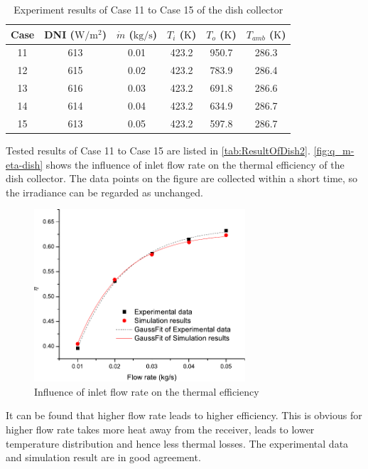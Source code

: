 \begin{table}[htbp]
	\caption{Experiment results of Case 11 to Case 15 of the dish collector}
	\centering
	\begin{tabular}{cccccc}
		\toprule
		Case	& DNI ($\mathrm{W/m^2}$)	&	$\dot{m}$ ($\mathrm{kg/s}$)			&	$T_i$ ($\mathrm{K}$)	&	$T_o$ ($\mathrm{K}$)		&	$T_{amb}$ ($\mathrm{K}$)\\
		\midrule
		11	&	613	&	0.01	&	423.2	&	950.7	&	286.3\\
		12	&	615	&	0.02	&	423.2	&	783.9	&	286.4\\
		13	&	616	&	0.03	&	423.2	&	691.8	&	286.6	\\
		14	&	614	&	0.04	&	423.2	&	634.9	&	286.7\\
		15	&	613	&	0.05	&	423.2	&	597.8	&	286.7\\
		\bottomrule
	\end{tabular}
	
	\label{tab:ResultOfDish2}
\end{table}
Tested results of Case 11 to Case 15 are listed in \autoref{tab:ResultOfDish2}.
\autoref{fig:q_m-eta-dish} shows the influence of inlet flow rate on the thermal efficiency of the dish collector. The data points on the figure are collected within a short time, so the irradiance can be regarded as unchanged.
\begin{figure}[!ht]
\centering
\includegraphics[width=0.7\textwidth]{fig/q_m-eta-dish}
\caption{Influence of inlet flow rate on the thermal efficiency}
\label{fig:q_m-eta-dish}
\end{figure}

It can be found that higher flow rate leads to higher efficiency. This is obvious for higher flow rate takes more heat away from the receiver, leads to lower temperature distribution and hence less thermal losses. The experimental data and simulation result are in good agreement.

